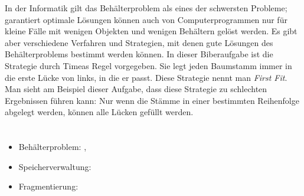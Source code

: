 {{In der Informatik gilt das Behälterproblem als eines der schwersten Probleme; garantiert optimale Lösungen können auch von Computerprogrammen nur für kleine Fälle mit wenigen Objekten und wenigen Behältern gelöst werden. Es gibt aber verschiedene Verfahren und Strategien, mit denen gute Lösungen des Behälterproblems bestimmt werden können. In dieser Biberaufgabe ist die Strategie durch Timeas Regel vorgegeben. Sie legt jeden Baumstamm immer in die erste Lücke von links, in die er passt. Diese Strategie nennt man \emph{First Fit}. Man sieht am Beispiel dieser Aufgabe, dass diese Strategie zu schlechten Ergebnissen führen kann: Nur wenn die Stämme in einer bestimmten Reihenfolge abgelegt werden, können alle Lücken gefüllt werden.



\section*{\BrochureWebsitesAndKeywords}
{\raggedright
\begin{itemize}
  \item Behälterproblem: \href{https://de.wikipedia.org/wiki/Beh\%C3\%A4lterproblem}{}, \href{https://lamarr-institute.org/de/blog/bin-packing/}{}
  \item Speicherverwaltung: \href{https://de.wikipedia.org/wiki/Speicherverwaltung}{}
  \item Fragmentierung: \href{https://de.wikipedia.org/wiki/Fragmentierung_(Dateisystem)}{}
\end{itemize}


}

}{}

\def\AuthorPelletJ{} %
\def\AuthorDatzkoThutS{} %
\def\AuthorDasovicD{} %
\def\AuthorBaumannL{} %

\newpage}{}
